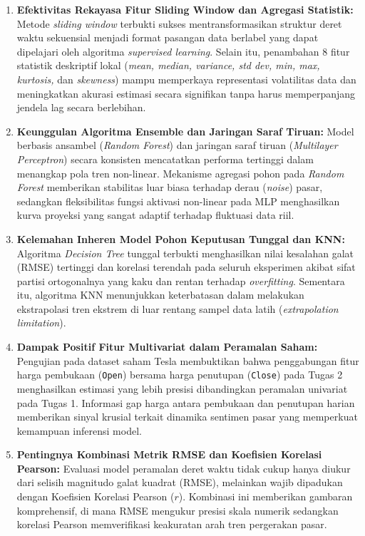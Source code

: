 \begin{enumerate}
    \item \textbf{Efektivitas Rekayasa Fitur Sliding Window dan Agregasi Statistik:} Metode \textit{sliding window} terbukti sukses mentransformasikan struktur deret waktu sekuensial menjadi format pasangan data berlabel yang dapat dipelajari oleh algoritma \textit{supervised learning}. Selain itu, penambahan 8 fitur statistik deskriptif lokal (\textit{mean, median, variance, std dev, min, max, kurtosis,} dan \textit{skewness}) mampu memperkaya representasi volatilitas data dan meningkatkan akurasi estimasi secara signifikan tanpa harus memperpanjang jendela lag secara berlebihan.
    
    \item \textbf{Keunggulan Algoritma Ensemble dan Jaringan Saraf Tiruan:} Model berbasis ansambel (\textit{Random Forest}) dan jaringan saraf tiruan (\textit{Multilayer Perceptron}) secara konsisten mencatatkan performa tertinggi dalam menangkap pola tren non-linear. Mekanisme agregasi pohon pada \textit{Random Forest} memberikan stabilitas luar biasa terhadap derau (\textit{noise}) pasar, sedangkan fleksibilitas fungsi aktivasi non-linear pada MLP menghasilkan kurva proyeksi yang sangat adaptif terhadap fluktuasi data riil.
    
    \item \textbf{Kelemahan Inheren Model Pohon Keputusan Tunggal dan KNN:} Algoritma \textit{Decision Tree} tunggal terbukti menghasilkan nilai kesalahan galat (RMSE) tertinggi dan korelasi terendah pada seluruh eksperimen akibat sifat partisi ortogonalnya yang kaku dan rentan terhadap \textit{overfitting}. Sementara itu, algoritma KNN menunjukkan keterbatasan dalam melakukan ekstrapolasi tren ekstrem di luar rentang sampel data latih (\textit{extrapolation limitation}).
    
    \item \textbf{Dampak Positif Fitur Multivariat dalam Peramalan Saham:} Pengujian pada dataset saham Tesla membuktikan bahwa penggabungan fitur harga pembukaan (\texttt{Open}) bersama harga penutupan (\texttt{Close}) pada Tugas 2 menghasilkan estimasi yang lebih presisi dibandingkan peramalan univariat pada Tugas 1. Informasi gap harga antara pembukaan dan penutupan harian memberikan sinyal krusial terkait dinamika sentimen pasar yang memperkuat kemampuan inferensi model.
    
    \item \textbf{Pentingnya Kombinasi Metrik RMSE dan Koefisien Korelasi Pearson:} Evaluasi model peramalan deret waktu tidak cukup hanya diukur dari selisih magnitudo galat kuadrat (RMSE), melainkan wajib dipadukan dengan Koefisien Korelasi Pearson ($r$). Kombinasi ini memberikan gambaran komprehensif, di mana RMSE mengukur presisi skala numerik sedangkan korelasi Pearson memverifikasi keakuratan arah tren pergerakan pasar.
\end{enumerate}

